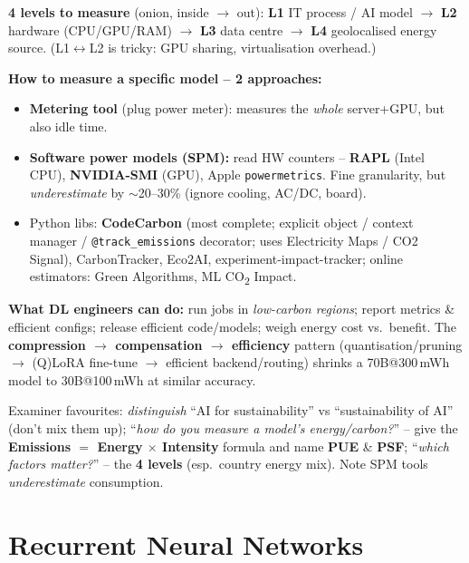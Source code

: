 \documentclass[10pt,a4paper]{article}
\begin{document}
	\textbf{4 levels to measure} (onion, inside $\to$ out): \textbf{L1} IT process / AI model $\to$ \textbf{L2} hardware (CPU/GPU/RAM) $\to$ \textbf{L3} data centre $\to$ \textbf{L4} geolocalised energy source. (L1$\leftrightarrow$L2 is tricky: GPU sharing, virtualisation overhead.)

	\textbf{How to measure a specific model -- 2 approaches:}
	\begin{itemize}[leftmargin=*]
		\item \textbf{Metering tool} (plug power meter): measures the \emph{whole} server+GPU, but also idle time.
		\item \textbf{Software power models (SPM):} read HW counters -- \textbf{RAPL} (Intel CPU), \textbf{NVIDIA-SMI} (GPU), Apple \texttt{powermetrics}. Fine granularity, but \emph{underestimate} by $\sim$20--30\% (ignore cooling, AC/DC, board).
		\item Python libs: \textbf{CodeCarbon} (most complete; explicit object / context manager / \texttt{@track\_emissions} decorator; uses Electricity Maps / CO2 Signal), CarbonTracker, Eco2AI, experiment-impact-tracker; online estimators: Green Algorithms, ML CO\textsubscript{2} Impact.
	\end{itemize}

	\begin{importantbox}
		\textbf{What DL engineers can do:} run jobs in \emph{low-carbon regions}; report metrics \& efficient configs; release efficient code/models; weigh energy cost vs.\ benefit. The \textbf{compression $\to$ compensation $\to$ efficiency} pattern (quantisation/pruning $\to$ (Q)LoRA fine-tune $\to$ efficient backend/routing) shrinks a 70B@300\,mWh model to 30B@100\,mWh at similar accuracy.
	\end{importantbox}

	\begin{examtipbox}
		Examiner favourites: \emph{distinguish} ``AI for sustainability'' vs ``sustainability of AI'' (don't mix them up); ``\emph{how do you measure a model's energy/carbon?}'' -- give the \textbf{Emissions $=$ Energy $\times$ Intensity} formula and name \textbf{PUE} \& \textbf{PSF}; ``\emph{which factors matter?}'' -- the \textbf{4 levels} (esp.\ country energy mix). Note SPM tools \emph{underestimate} consumption.
	\end{examtipbox}

	\section{Recurrent Neural Networks}
\end{document}

